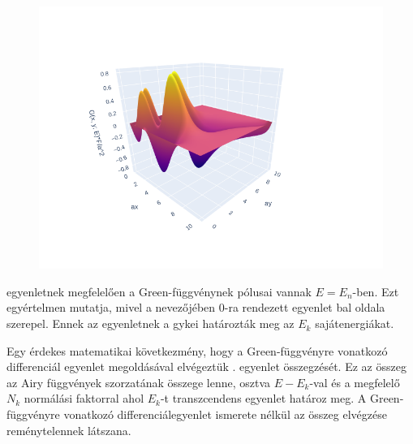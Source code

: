 \begin{figure}[H]
	\centering
	\includegraphics[scale=0.65]{./figs/2dgreen.png}
	\caption[Két dimenziós Green-függvény]{}
	\label{egzakt:2dgreen}
\end{figure}

 egyenletnek megfelelően a Green-függvénynek pólusai vannak $E=E_n$-ben. Ezt  egyértelmen mutatja, mivel a nevezőjében  $0$-ra rendezett egyenlet bal oldala szerepel. Ennek az egyenletnek a gykei határozták meg az $E_k$ sajátenergiákat.

Egy érdekes matematikai következmény, hogy a Green-függvényre vonatkozó differenciál egyenlet megoldásával elvégeztük . egyenlet összegzését. Ez az összeg az Airy függvények szorzatának összege lenne, osztva $E-E_k$-val és a megfelelő $N_k$ normálási faktorral ahol $E_k$-t  transzcendens egyenlet határoz meg. A Green-függvényre vonatkozó differenciálegyenlet ismerete nélkül az összeg elvégzése reménytelennek látszana.